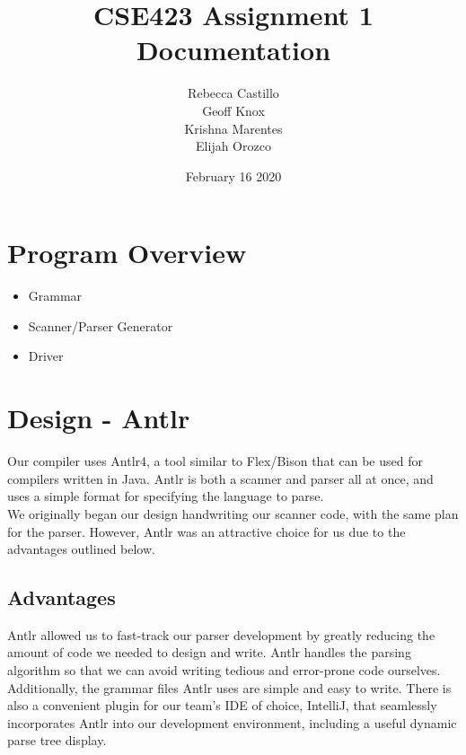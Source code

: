 \documentclass{article}
\title{CSE423 Assignment 1 Documentation}
\author{Rebecca Castillo\\Geoff Knox\\Krishna Marentes\\Elijah Orozco}
\date{February 16 2020}
\begin{document}
\maketitle

\section{Program Overview}
\begin{itemize}
    \item Grammar
    \item Scanner/Parser Generator
    \item Driver
\end{itemize}

\section{Design - Antlr}
Our compiler uses Antlr4, a tool similar to Flex/Bison that can be used for compilers written in Java. Antlr is both a scanner and parser all at once, and uses a simple format for specifying the language to parse.\\
We originally began our design handwriting our scanner code, with the same plan for the parser. However, Antlr was an attractive choice for us due to the advantages outlined below.
\subsection{Advantages}
Antlr allowed us to fast-track our parser development by greatly reducing the amount of code we needed to design and write. Antlr handles the parsing algorithm so that we can avoid writing tedious and error-prone code ourselves. Additionally, the grammar files Antlr uses are simple and easy to write. There is also a convenient plugin for our team's IDE of choice, IntelliJ, that seamlessly incorporates Antlr into our development environment, including a useful dynamic parse tree display.
\end{document}
